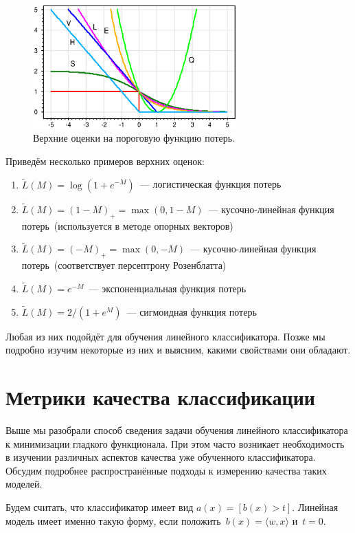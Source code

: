 \documentclass[12pt,fleqn]{article}
\begin{document}
\begin{figure}[t]
    \centering
    \includegraphics[width=0.7\textwidth]{threshold-approx-2.eps}
    \caption{Верхние оценки на пороговую функцию потерь.}
    \label{fig:bounds}
\end{figure}

Приведём несколько примеров верхних оценок:
\begin{enumerate}
    \item $\tilde L(M) = \log \left(1 + e^{-M} \right)$~--- логистическая функция потерь
    \item $\tilde L(M) = (1 - M)_+ = \max(0, 1 - M)$~--- кусочно-линейная функция потерь~(используется в методе опорных векторов)
    \item $\tilde L(M) = (-M)_+ = \max(0, -M)$~--- кусочно-линейная функция потерь~(соответствует персептрону Розенблатта)
    \item $\tilde L(M) = e^{-M}$~--- экспоненциальная функция потерь
    \item $\tilde L(M) = 2/(1 + e^M)$~--- сигмоидная функция потерь
\end{enumerate}
Любая из них подойдёт для обучения линейного классификатора.
Позже мы подробно изучим некоторые из них и выясним, какими свойствами они обладают.

\section{Метрики качества классификации}
Выше мы разобрали способ сведения задачи обучения линейного классификатора
к минимизации гладкого функционала.
При этом часто возникает необходимость в изучении различных аспектов качества
уже обученного классификатора.
Обсудим подробнее распространённые подходы к измерению качества таких моделей.

Будем считать, что классификатор имеет вид $a(x) = [b(x) > t]$.
Линейная модель имеет именно такую форму, если положить~$b(x) = \langle w, x \rangle$ и~$t = 0$.
\end{document}
